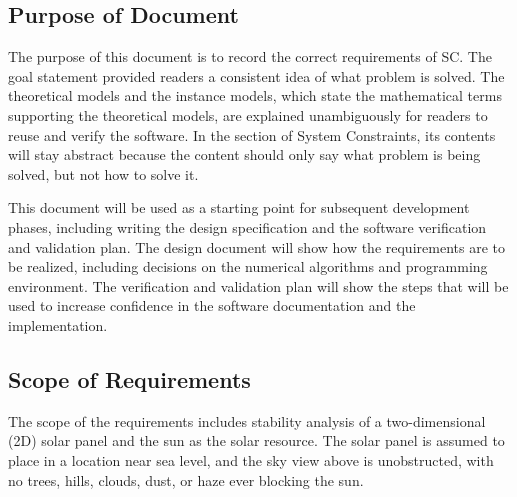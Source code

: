 \documentclass[12pt]{article}
\begin{document}
\subsection{Purpose of Document}

\medskip

The purpose of this document is to record the correct requirements of SC. The goal statement provided readers a consistent idea of what problem is solved. The theoretical models and the instance models, which state the mathematical terms supporting the theoretical models, are explained unambiguously for readers to reuse and verify the software. In the section of System Constraints, its contents will stay abstract because the content should only say what problem is being solved, but not how to solve it.

This document will be used as a starting point for subsequent development phases, including writing the design specification and the software verification and validation plan.
The design document will show how the requirements are to be realized, including decisions
on the numerical algorithms and programming environment. The verification and validation
plan will show the steps that will be used to increase confidence in the software documentation and the implementation. 

\subsection{Scope of Requirements} 
The scope of the requirements includes stability analysis of a two-dimensional (2D) solar panel and the sun as the solar resource. The solar panel is assumed to place in a location near sea level, and the sky view above is unobstructed, with no trees, hills, clouds, dust, or haze ever blocking the sun.

\iffalse{}  
\end{document}
